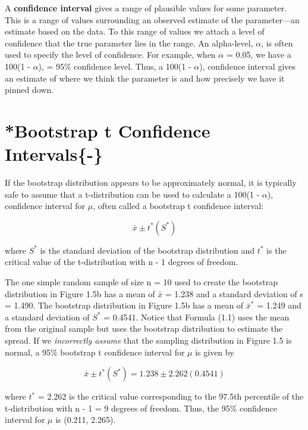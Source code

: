 \documentclass[
]{report}
\begin{document}
A \textbf{confidence interval} gives a range of plausible values for some parameter. This is a range of values surrounding an observed estimate of the parameter---an estimate based on the data. To this range of values we attach a level of confidence that the true parameter lies in the range. An alpha-level, \(\alpha\), is often used to specify the level of confidence. For example, when \(\alpha\) = 0.05, we have a 100(1 - \(\alpha\)), = 95\(\%\) confidence level. Thus, a 100(1 - \(\alpha\)), confidence interval gives an estimate of where we think the parameter is and how precisely we have it pinned down.

\section{\texorpdfstring{*\textbf{Bootstrap t Confidence Intervals}\{-\}}{*Bootstrap t Confidence Intervals\{-\}}}\label{bootstrap-t-confidence-intervals-}

If the bootstrap distribution appears to be approximately normal, it is typically safe to assume that a
t-distribution can be used to calculate a 100(1 - \(\alpha\)), confidence interval for \(\mu\), often called a bootstrap
t confidence interval:

\begin{equation} 
  \bar{x} \pm t^*\left(S^*\right)
  \tag{1.1} \label{eq:1_1}
\end{equation}

where \(S^*\) is the standard deviation of the bootstrap distribution and \(t^*\) is the critical value of the t-distribution with n - 1 degrees of freedom.

The one simple random sample of size n = 10 used to create the bootstrap distribution in Figure 1.5b has a mean of \(\bar{x}\) = 1.238 and a standard deviation of s = 1.490. The bootstrap distribution in Figure 1.5b has a mean of \(\bar{x}^*\) = 1.249 and a standard deviation of \(S^*\) = 0.4541. Notice that Formula (1.1) uses the mean from the original sample but uses the bootstrap distribution to estimate the spread. If we \emph{incorrectly assume} that the sampling distribution in Figure 1.5 is normal, a 95\% bootstrap t confidence interval for \(\mu\) is given by

\begin{equation} 
  \bar{x} \pm t^*\left(S^*\right) = 1.238 \pm 2.262(0.4541)
\end{equation}

where \(t^*\) = 2.262 is the critical value corresponding to the 97.5th percentile of the t-distribution with n - 1 = 9
degrees of freedom. Thus, the 95\% confidence interval for \(\mu\) is (0.211, 2.265).
\end{document}
